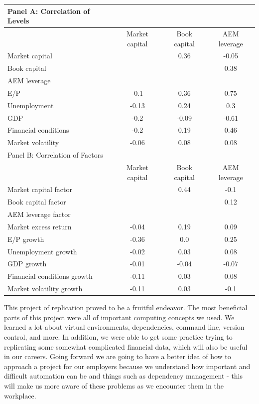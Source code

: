 \documentclass{article}
\begin{document}
    \begin{table}[htbp]
    \centering
    \begin{adjustbox}{max width=\textwidth}
    \small
    \begin{tabular}{lccc}
        \toprule
        Panel A: Correlation of Levels \\
        \midrule
         & Market capital & Book capital & AEM leverage \\
        \midrule
        Market capital &  & 0.36 & -0.05 \\
Book capital &  &  & 0.38 \\
AEM leverage &  &  &  \\
E/P & -0.1 & 0.36 & 0.75 \\
Unemployment & -0.13 & 0.24 & 0.3 \\
GDP & -0.2 & -0.09 & -0.61 \\
Financial conditions & -0.2 & 0.19 & 0.46 \\
Market volatility & -0.06 & 0.08 & 0.08 \\
        \midrule
        Panel B: Correlation of Factors \\
        \midrule
         & Market capital & Book capital & AEM leverage \\
        \midrule
        Market capital factor &  & 0.44 & -0.1 \\
Book capital factor &  &  & 0.12 \\
AEM leverage factor &  &  &  \\
Market excess return & -0.04 & 0.19 & 0.09 \\
E/P growth & -0.36 & 0.0 & 0.25 \\
Unemployment growth & -0.02 & 0.03 & 0.08 \\
GDP growth & -0.01 & -0.04 & -0.07 \\
Financial conditions growth & -0.11 & 0.03 & 0.08 \\
Market volatility growth & -0.11 & 0.03 & -0.1 \\
        \bottomrule
    \end{tabular}
    \end{adjustbox}
    \end{table}
    
\par
This project of replication proved to be a fruitful endeavor. The most beneficial parts of this project were all of important computing concepts we used. We learned a lot about virtual environments, dependencies, command line, version control, and more. In addition, we were able to get some practice trying to replicating some somewhat complicated financial data, which will also be useful in our careers.
Going forward we are going to have a better idea of how to approach a project for our employers because we understand how important and difficult automation can be and things such as dependency management - this will make us more aware of these problems as we encounter them in the workplace.\par
\end{document}
